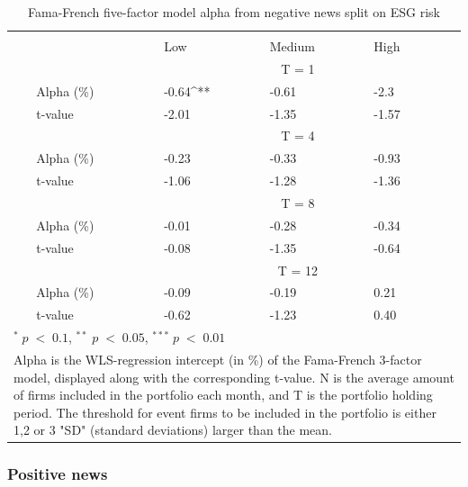 \setlength{\tabcolsep}{15pt}
\begin{table}[H]
\small
\centering
\caption{Fama-French five-factor model alpha from negative news split on ESG risk} 
\begin{tabular}{llllllc}
\hline \hline \\ 
 &     &  &    Low  &  Medium  &  High &  \\    \cline{4-6} 
& & & \multicolumn{3}{c}{ T = 1} & \\ \cline{2-6}
& Alpha (\%)  &  & -0.64^{**}  & -0.61  & -2.3 &  \\ 
& t-value &  & -2.01 & -1.35  & -1.57 &  \\
& & & \multicolumn{3}{c}{ T = 4} & \\ \cline{2-6}
& Alpha (\%)  &  & -0.23  & -0.33  &  -0.93 & \\
& t-value &  & -1.06 & -1.28  & -1.36 & \\
& & & \multicolumn{3}{c}{ T = 8} & \\ \cline{2-6}
& Alpha (\%)   &  & -0.01   & -0.28  & -0.34 &  \\
& t-value &  & -0.08  & -1.35 & -0.64 &  \\
& & & \multicolumn{3}{c}{ T = 12} & \\ \cline{2-6}
& Alpha (\%)   &  & -0.09  & -0.19  & 0.21 &  \\
& t-value &  & -0.62  & -1.23 & 0.40 &  \\
\hline \hline
 \multicolumn{7}{l}{ \footnotesize $^* \; p\; <\; 0.1$, $ ^{**} \; p\; <\; 0.05$, $ ^{***} \; p\; <\; 0.01$  } \\
 \multicolumn{7}{p{11.5cm}}{ \footnotesize Alpha is the WLS-regression intercept (in \%) of the Fama-French 3-factor model, displayed along with the corresponding t-value. N is the average amount of firms included in the portfolio each month, and T is the portfolio holding period. The threshold for event firms to be included in the portfolio is either 1,2 or 3 "SD" (standard deviations) larger than the mean.} \\ 
 \hline
\end{tabular}
\label{tab: FF5_neg_ESG}
\end{table}




\subsubsection{Positive news}

